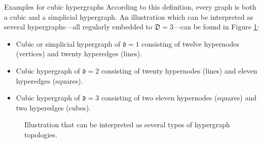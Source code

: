 \documentclass[a4paper, english, 12pt, reqno, draft]{amsart}
\makeatletter
\theoremstyle{definition}
\theoremstyle{remark}
\numberwithin{equation}{section}
\newcommand{\locDim}{\ensuremath{\mathfrak d}}
\newcommand{\globDim}{\ensuremath{\mathfrak D}}
\def\paragraph{\@startsection{paragraph}{4}%
  \z@\z@{-\fontdimen2\font}%
  {\normalfont\scshape}}
\makeatother
\begin{document}
\paragraph{Examples for cubic hypergraphs}
% 
According to this definition, every graph is both a cubic and a simplicial hypergraph. An illustration which can be interpreted as several hypergraphs---all regularly embedded to $\globDim = 3$---can be found in Figure \ref{FIG:hyG_topo}:
% 
\begin{itemize}
 \item Cubic or simplicial hypergraph of $\locDim = 1$ consisting of twelve hypernodes (vertices) and  twenty hyperedges (lines).
 \item Cubic hypergraph of $\locDim = 2$ consisting of twenty hypernodes (lines) and eleven hyperedges (squares).
 \item Cubic hypergraph of $\locDim = 3$ consisting of two eleven hypernodes (squares) and two hyperedges (cubes).
\end{itemize}
% 
\begin{figure}[ht]
 \caption{Illustration that can be interpreted as several types of hypergraph topologies.}\label{FIG:hyG_topo}
\end{figure}
% 
\end{document}
